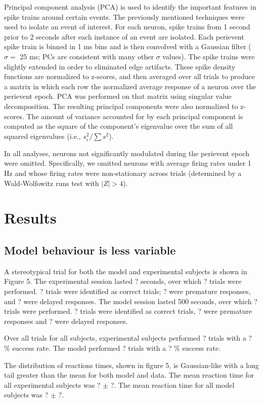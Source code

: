 \documentclass[12pt]{article}
\begin{document}
Principal component analysis (PCA)
is used to identify the important features
in spike trains around certain events.
The previously mentioned techniques
were used to isolate an event of interest.
For each neuron, spike trains from 1 second prior to
2 seconds after each instance of an event are isolated.
Each perievent spike train is binned in 1 ms bins and is then
convolved with a Gaussian filter ($\sigma = $ 25 ms;
PCs are consistent with many other $\sigma$ values).
The spike trains were slightly extended
in order to eliminated edge artifacts.
These spike density functions
are normalized to z-scores,
and then averaged over all trials to
produce a matrix in which each row
the normalized average response of a neuron
over the perievent epoch.
PCA was performed on that matrix
using singular value decomposition.
The resulting principal components
were also normalized to z-scores.
The amount of variance accounted for by each principal component
is computed as the square of the component's eigenvalue
over the sum of all squared eigenvalues
(i.e., $s_i^2 / \sum s^2$).

In all analyses, neurons not significantly modulated
during the perievent epoch were omitted.
Specifically, we omitted neurons with average firing rates
under 1 Hz and whose firing rates were non-stationary
across trials
(determined by a Wald-Wolfowitz runs test with $|Z| > 4$).

\section{Results}

\subsection{Model behaviour is less variable}

A stereotypical trial for both the model
and experimental subjects is shown
in Figure 5.
The experimental session lasted ? seconds,
over which ? trials were performed.
? trials were identified as correct trials;
? were premature responses,
and ? were delayed responses.
The model session lasted 500 seconds,
over which ? trials were performed.
? trials were identified as correct trials,
? were premature responses
and ? were delayed responses.

Over all trials for all subjects,
experimental subjects performed ? trials
with a ? \% success rate.
The model performed ? trials with a
? \% success rate.

The distribution of reactions times, shown in figure 5,
is Gaussian-like with a long tail greater than the mean
for both model and data.
The mean reaction time for all experimental subjects
was ? $\pm$ ?.
The mean reaction time for all model subjects
was ? $\pm$ ?.
\end{document}
